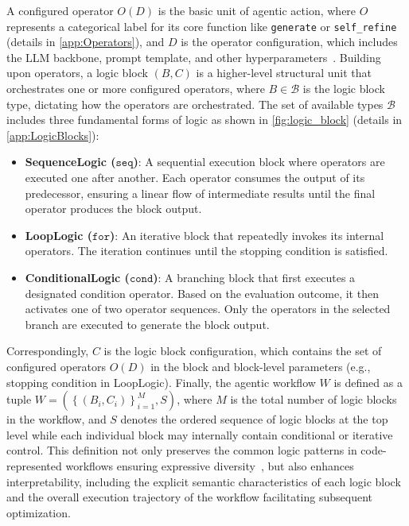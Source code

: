 \documentclass{article}
\theoremstyle{plain}
\theoremstyle{definition}
\theoremstyle{remark}
\begin{document}
A configured operator $O(D)$ is the basic unit of agentic action, where $O$ represents a categorical label for its core function like \texttt{generate} or \texttt{self\_refine} (details in \cref{app:Operators}), and $D$ is the operator configuration, which includes the LLM backbone, prompt template, and other hyperparameters~\citep{zhang_aflow_2025}. Building upon operators, a logic block $(B, C)$ is a higher-level structural unit that orchestrates one or more configured operators, where $B \in \mathcal{B}$ is the logic block type, dictating how the operators are orchestrated. The set of available types $\mathcal{B}$ includes three fundamental forms of logic as shown in \cref{fig:logic_block} (details in \cref{app:LogicBlocks}):
\begin{itemize}
    \item \textbf{SequenceLogic ($\texttt{seq}$)}: A sequential execution block where operators are executed one after another. Each operator consumes the output of its predecessor, ensuring a linear flow of intermediate results until the final operator produces the block output.
    \item \textbf{LoopLogic ($\texttt{for}$)}: An iterative block that repeatedly invokes its internal operators. The iteration continues until the stopping condition is satisfied.
    \item \textbf{ConditionalLogic ($\texttt{cond}$)}: A branching block that first executes a designated condition operator. Based on the evaluation outcome, it then activates one of two operator sequences. Only the operators in the selected branch are executed to generate the block output.
\end{itemize}

Correspondingly, $C$ is the logic block configuration, which contains the set of configured operators $O(D)$ in the block and block-level parameters (e.g., stopping condition in LoopLogic). Finally, the agentic workflow $W$ is defined as a tuple $W = \left(\left\{(B_i, C_i)\right\}_{i=1}^M, S\right)$, where $M$ is the total number of logic blocks in the workflow, and $S$ denotes the ordered sequence of logic blocks at the top level while each individual block may internally contain conditional or iterative control. This definition not only preserves the common logic patterns in code-represented workflows ensuring expressive diversity~\citep{hu_automated_2025,zhang_aflow_2025}, but also enhances interpretability, including the explicit semantic characteristics of each logic block and the overall execution trajectory of the workflow facilitating subsequent optimization.
\end{document}
